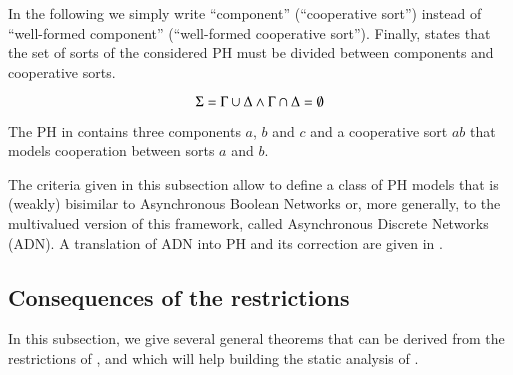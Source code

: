 In the following we simply write “component” (\resp “cooperative sort”) instead of “well-formed component” (\resp “well-formed cooperative sort”).
Finally,  states that the set of sorts of the considered PH must be divided between components and cooperative sorts.
\begin{criterion}
\label{cr:compcs}
  $$\Sigma = \Gamma \cup \Delta \wedge \Gamma \cap \Delta = \emptyset$$
\end{criterion}

\begin{example}
  The PH in  contains three components $a$, $b$ and $c$ and a cooperative sort $ab$ that models cooperation between sorts $a$ and $b$.
\end{example}

The criteria given in this subsection allow to define a class of PH models that is (weakly) bisimilar to Asynchronous Boolean Networks
or, more generally, to the multivalued version of this framework, called Asynchronous Discrete Networks (ADN).
A translation of ADN into PH and its correction are given in .



\subsection{Consequences of the restrictions}

In this subsection, we give several general theorems that can be derived from the restrictions of ,
and which will help building the static analysis of .

